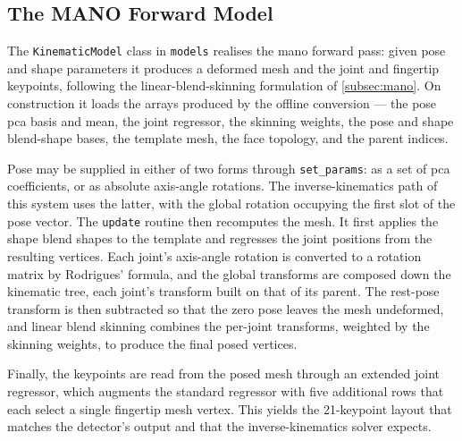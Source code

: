 \subsection{The MANO Forward Model}\label{subsec:forward_model}

The \texttt{KinematicModel} class in \texttt{models} realises the \acrshort{mano}
forward pass: given pose and shape parameters it produces a deformed mesh and the
joint and fingertip keypoints, following the linear-blend-skinning formulation of
\autoref{subsec:mano}. On construction it loads the arrays produced by the offline
conversion --- the pose \acrshort{pca} basis and mean, the joint regressor, the
skinning weights, the pose and shape blend-shape bases, the template mesh, the
face topology, and the parent indices.

Pose may be supplied in either of two forms through \texttt{set\_params}: as a set
of \acrshort{pca} coefficients, or as absolute axis-angle rotations. The
inverse-kinematics path of this system uses the latter, with the global rotation
occupying the first slot of the pose vector. The \texttt{update} routine then
recomputes the mesh. It first applies the shape blend shapes to the template and
regresses the joint positions from the resulting vertices. Each joint's axis-angle
rotation is converted to a rotation matrix by Rodrigues' formula, and the global
transforms are composed down the kinematic tree, each joint's transform built on
that of its parent. The rest-pose transform is then subtracted so that the zero
pose leaves the mesh undeformed, and linear blend skinning combines the
per-joint transforms, weighted by the skinning weights, to produce the final
posed vertices.

Finally, the keypoints are read from the posed mesh through an extended joint
regressor, which augments the standard regressor with five additional rows that
each select a single fingertip mesh vertex. This yields the 21-keypoint layout
that matches the detector's output and that the inverse-kinematics solver expects.
